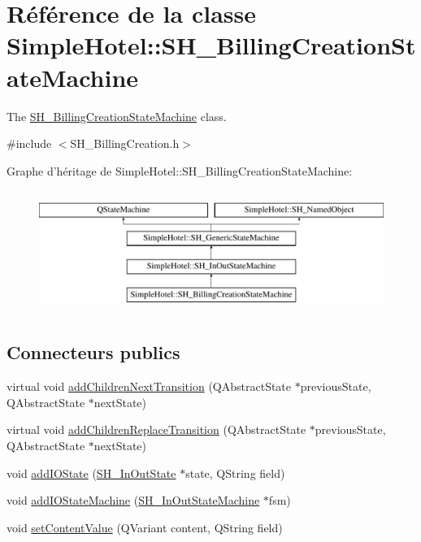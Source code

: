 \hypertarget{classSimpleHotel_1_1SH__BillingCreationStateMachine}{\section{Référence de la classe Simple\-Hotel\-:\-:S\-H\-\_\-\-Billing\-Creation\-State\-Machine}
\label{classSimpleHotel_1_1SH__BillingCreationStateMachine}
}


The \hyperlink{classSimpleHotel_1_1SH__BillingCreationStateMachine}{S\-H\-\_\-\-Billing\-Creation\-State\-Machine} class.  




{\ttfamily \#include $<$S\-H\-\_\-\-Billing\-Creation.\-h$>$}

Graphe d'héritage de Simple\-Hotel\-:\-:S\-H\-\_\-\-Billing\-Creation\-State\-Machine\-:\begin{figure}[H]
\begin{center}
\leavevmode
\includegraphics[height=4.000000cm]{classSimpleHotel_1_1SH__BillingCreationStateMachine}
\end{center}
\end{figure}
\subsection*{Connecteurs publics}
\begin{DoxyCompactItemize}
\item 
virtual void \hyperlink{classSimpleHotel_1_1SH__InOutStateMachine_aaf5afe04d6e4d3d5ebf0b5f1b00eddf1}{add\-Children\-Next\-Transition} (Q\-Abstract\-State $\ast$previous\-State, Q\-Abstract\-State $\ast$next\-State)
\item 
virtual void \hyperlink{classSimpleHotel_1_1SH__InOutStateMachine_a3339fd43658e6ac0979bd43014785766}{add\-Children\-Replace\-Transition} (Q\-Abstract\-State $\ast$previous\-State, Q\-Abstract\-State $\ast$next\-State)
\item 
void \hyperlink{classSimpleHotel_1_1SH__InOutStateMachine_a07ae9f1f74a9a41b26e77a014679a33e}{add\-I\-O\-State} (\hyperlink{classSimpleHotel_1_1SH__InOutState}{S\-H\-\_\-\-In\-Out\-State} $\ast$state, Q\-String field)
\item 
void \hyperlink{classSimpleHotel_1_1SH__InOutStateMachine_a27a59a44e0bcddf90d40b38788bb38f4}{add\-I\-O\-State\-Machine} (\hyperlink{classSimpleHotel_1_1SH__InOutStateMachine}{S\-H\-\_\-\-In\-Out\-State\-Machine} $\ast$fsm)
\item 
void \hyperlink{classSimpleHotel_1_1SH__InOutStateMachine_aaf92da452f6cf7cc57aa9e60f88322e4}{set\-Content\-Value} (Q\-Variant content, Q\-String field)
\end{DoxyCompactItemize}
